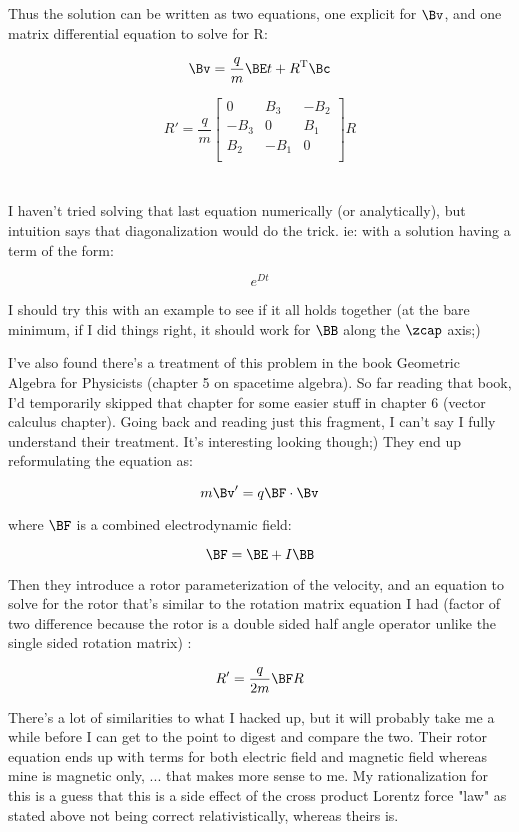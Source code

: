 \documentclass{article}      %
\newcommand{\T}[0]{\text{T}}
\begin{document}
Thus the solution can be written as two equations, one explicit for $\Bv$, and one matrix differential equation to solve for R:

\[
\Bv = \frac{q}{m} \BE t + R^\T \Bc
\]

\[
R' = \frac{q}{m}
\begin{bmatrix}
0 & B_3 & -B_2 \\
-B_3 & 0 & B_1 \\
B_2 & -B_1 & 0 \\
\end{bmatrix}
R
\]

\section{}

I haven't tried solving that last equation numerically (or analytically), but intuition says that diagonalization would do the trick.  ie: with a solution having a term of the form:

\[
e^{Dt}
\]

I should try this with an example to see if it all holds together (at the bare minimum, if I did things right, it should work for $\BB$ along the $\zcap$ axis;)

I've also found there's a treatment of this problem in the book Geometric Algebra for Physicists (chapter 5 on spacetime algebra).  So far reading that book, I'd temporarily skipped that chapter for some easier stuff in chapter 6 (vector calculus chapter).  Going back and reading just this fragment, I can't say I fully understand their treatment.  It's interesting looking though;)  They end up reformulating the equation as:

\[
m \Bv' = q \BF \cdot \Bv
\]

where $\BF$ is a combined electrodynamic field:

\[
\BF = \BE + I \BB
\]

Then they introduce a rotor parameterization of the velocity, and an equation to solve for the rotor that's similar to the rotation matrix equation I had (factor of two difference because the rotor is a double sided half angle operator unlike the single sided rotation matrix) :

\[
R' = \frac{q}{2m} \BF R
\]

There's a lot of similarities to what I hacked up, but it will probably take me a while before I can get to the point to digest and compare the two.   Their rotor equation ends up with terms for both electric field and magnetic field whereas mine is magnetic only, ... that makes more sense to me.  My rationalization for this is a guess that this is a side effect of the cross product Lorentz force "law" as stated above not being correct relativistically, whereas theirs is.
\end{document}
